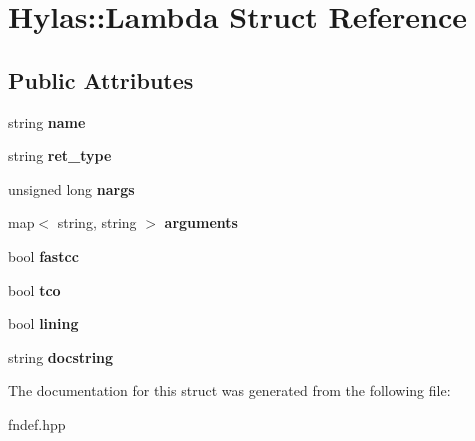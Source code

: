 \hypertarget{structHylas_1_1Lambda}{
\section{Hylas::Lambda Struct Reference}
\label{structHylas_1_1Lambda}
}
\subsection*{Public Attributes}
\begin{DoxyCompactItemize}
\item 
\hypertarget{structHylas_1_1Lambda_a12efa497114066848dd624bf52fda37d}{
string {\bfseries name}}
\label{structHylas_1_1Lambda_a12efa497114066848dd624bf52fda37d}

\item 
\hypertarget{structHylas_1_1Lambda_a1172a9a8b0f961d5f541182b1209792b}{
string {\bfseries ret\_\-type}}
\label{structHylas_1_1Lambda_a1172a9a8b0f961d5f541182b1209792b}

\item 
\hypertarget{structHylas_1_1Lambda_afc442e5b73f0603e3daf0535e41cf696}{
unsigned long {\bfseries nargs}}
\label{structHylas_1_1Lambda_afc442e5b73f0603e3daf0535e41cf696}

\item 
\hypertarget{structHylas_1_1Lambda_a124b3dfe66094876aa7682bb0dc8ec5e}{
map$<$ string, string $>$ {\bfseries arguments}}
\label{structHylas_1_1Lambda_a124b3dfe66094876aa7682bb0dc8ec5e}

\item 
\hypertarget{structHylas_1_1Lambda_a8b881211c7042316ced0dae3ef7f2a5f}{
bool {\bfseries fastcc}}
\label{structHylas_1_1Lambda_a8b881211c7042316ced0dae3ef7f2a5f}

\item 
\hypertarget{structHylas_1_1Lambda_af8975a872b39bde4d75c42d83e6ee6cb}{
bool {\bfseries tco}}
\label{structHylas_1_1Lambda_af8975a872b39bde4d75c42d83e6ee6cb}

\item 
\hypertarget{structHylas_1_1Lambda_ad30b10319eb86291d66026aaf0cb492b}{
bool {\bfseries lining}}
\label{structHylas_1_1Lambda_ad30b10319eb86291d66026aaf0cb492b}

\item 
\hypertarget{structHylas_1_1Lambda_a0c597e219180835bcf080d2a65b7f0df}{
string {\bfseries docstring}}
\label{structHylas_1_1Lambda_a0c597e219180835bcf080d2a65b7f0df}

\end{DoxyCompactItemize}


The documentation for this struct was generated from the following file:\begin{DoxyCompactItemize}
\item 
fndef.hpp\end{DoxyCompactItemize}
